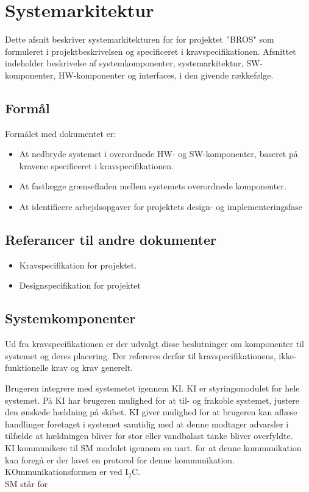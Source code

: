 \section{Systemarkitektur}
Dette afsnit beskriver systemarkitekturen for for projektet ”BROS" som formuleret i projektbeskrivelsen og specificeret i kravspecifikationen.
Afsnittet indeholder beskrivelse af systemkomponenter, systemarkitektur, SW-komponenter, HW-komponenter og interfaces, i den givende rækkefølge.

\subsection{Formål}
Formålet med dokumentet er:
\begin{itemize}
\item At nedbryde systemet i overordnede HW- og SW-komponenter, baseret på kravene specificeret i kravspecifikationen.
\item At fastlægge grænsefladen mellem systemets overordnede komponenter.
\item At identificere arbejdsopgaver for projektets design- og implementeringsfase
\end{itemize}

\subsection{Referancer til andre dokumenter}
\begin{itemize}
\item Kravspecifikation for projektet.
\item Designspecifikation for projektet
\end{itemize}

\subsection{Systemkomponenter}
Ud fra kravspecifikationen er der udvalgt disse beslutninger om komponenter til systemet og deres placering. Der refereres derfor til kravspecifikationens, ikke-funktionelle krav og krav generelt.

Brugeren integrere med systemetet igennem KI. KI er styringsmodulet for hele systemet. På KI har brugeren mulighed for at til- og frakoble systemet, justere den ønskede hældning på skibet. KI giver mulighed for at brugeren kan aflæse handlinger foretaget i systemet samtidig med at denne modtager advarsler i tilfælde at hældningen bliver for stor eller vandbalast tanke bliver overfyldte.\\
KI kommunikere til SM modulet igennem en uart. for at denne kommunikation kan foregå er der lavet en protocol for denne kommunikation. KOmmunikationsformen er ved I$_2$C.\\
SM står for  